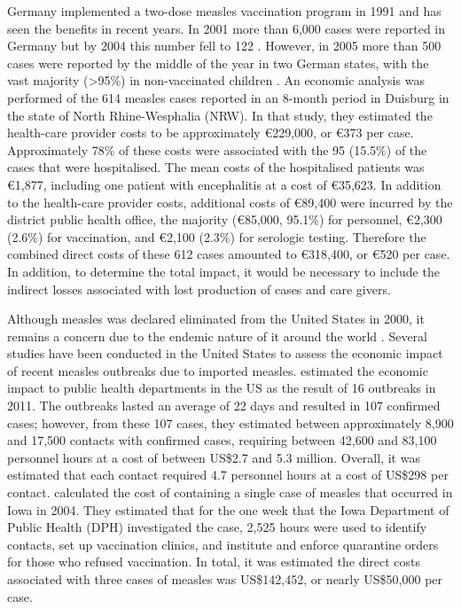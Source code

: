 \documentclass{article}
\begin{document}
{Germany implemented a two-dose measles vaccination program in 1991 and has seen the benefits in recent years. In 2001 more than 6,000 cases were reported in Germany but by 2004 this number fell to 122 \citep{wichmann9}. However, in 2005 more than 500 cases were reported by the middle of the year in two German states, with the vast majority (>95\%) in non-vaccinated children \citep{siedler6}. An economic analysis was performed of the 614 measles cases reported in an 8-month period in Duisburg in the state of North Rhine-Wesphalia (NRW). In that study, they estimated the health-care provider costs to be approximately \euro 229,000, or \euro 373 per case. Approximately 78\% of these costs were associated with the 95 (15.5\%) of the cases that were hospitalised. The mean costs of the hospitalised patients was  \euro 1,877, including one patient with encephalitis at a cost of \euro 35,623. In addition to the health-care provider costs, additional costs of \euro 89,400 were incurred by the district public health office, the majority (\euro 85,000, 95.1\%) for personnel, \euro 2,300 (2.6\%) for vaccination, and \euro 2,100 (2.3\%) for serologic testing. Therefore the combined direct costs of these 612 cases amounted to \euro 318,400, or \euro 520 per case. In addition, to determine the total impact, it would be necessary to include the indirect losses associated with lost production of cases and care givers.

Although measles was declared eliminated from the United States in 2000, it remains a concern due to the endemic nature of it around the world \citep{parker6}. Several studies have been conducted in the United States to assess the economic impact of recent measles outbreaks due to imported measles.  \citep{ortegasanchez14} estimated the economic impact to public health departments in the US as the result of 16 outbreaks in 2011. The outbreaks lasted an average of 22 days and resulted in 107 confirmed cases; however, from these 107 cases, they estimated between approximately 8,900 and 17,500 contacts with confirmed cases, requiring between 42,600 and 83,100 personnel hours at a cost of between US\$2.7 and 5.3 million. Overall, it was estimated that each contact required 4.7 personnel hours at a cost of US\$298 per contact.
\citep{dayan5} calculated the cost of containing a single case of measles that occurred in Iowa in 2004. They estimated that for the one week that the Iowa Department of Public Health (DPH) investigated the case, 2,525 hours were used to identify contacts, set up vaccination clinics, and institute and enforce quarantine orders for those who refused vaccination. In total, it was estimated the direct costs associated with three cases of measles was US\$142,452, or nearly US\$50,000 per case.

}
\end{document}
